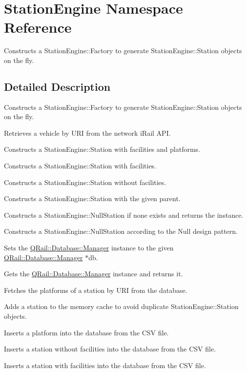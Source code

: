 \hypertarget{namespaceStationEngine}{}\section{Station\+Engine Namespace Reference}
\label{namespaceStationEngine}


Constructs a Station\+Engine\+::\+Factory to generate Station\+Engine\+::\+Station objects on the fly.  




\subsection{Detailed Description}
Constructs a Station\+Engine\+::\+Factory to generate Station\+Engine\+::\+Station objects on the fly. 

Retrieves a vehicle by U\+RI from the network i\+Rail A\+PI.

Constructs a Station\+Engine\+::\+Station with facilities and platforms.

Constructs a Station\+Engine\+::\+Station with facilities.

Constructs a Station\+Engine\+::\+Station without facilities.

Constructs a Station\+Engine\+::\+Station with the given parent.

Constructs a Station\+Engine\+::\+Null\+Station if none exists and returns the instance.

Constructs a Station\+Engine\+::\+Null\+Station according to the Null design pattern.

Sets the \mbox{\hyperlink{classQRail_1_1Database_1_1Manager}{Q\+Rail\+::\+Database\+::\+Manager}} instance to the given \mbox{\hyperlink{classQRail_1_1Database_1_1Manager}{Q\+Rail\+::\+Database\+::\+Manager}} $\ast$db.

Gets the \mbox{\hyperlink{classQRail_1_1Database_1_1Manager}{Q\+Rail\+::\+Database\+::\+Manager}} instance and returns it.

Fetches the platforms of a station by U\+RI from the database.

Adds a station to the memory cache to avoid duplicate Station\+Engine\+::\+Station objects.

Inserts a platform into the database from the C\+SV file.

Inserts a station without facilities into the database from the C\+SV file.

Inserts a station with facilities into the database from the C\+SV file.

